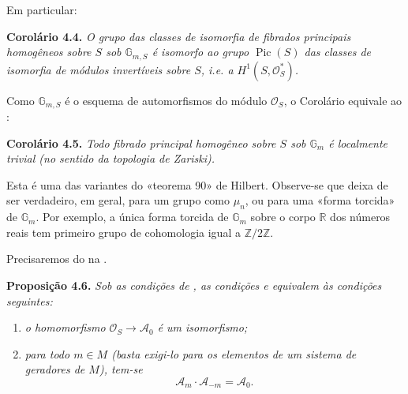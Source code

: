 Em particular:

\medskip
\noindent{}\textbf{Corolário 4.4.}
\textit{O grupo das classes de isomorfia de fibrados principais homogêneos
sobre \(S\) sob \(\mathbb G_{m,S}\) é isomorfo ao grupo
\(\operatorname{Pic}(S)\) das classes de isomorfia de módulos invertíveis
sobre \(S\), i.e. a \(H^1(S,\mathcal O_S^*)\).}

Como \(\mathbb G_{m,S}\) é o esquema de automorfismos do módulo
\(\mathcal O_S\), o Corolário
 equivale ao
:

\medskip
\noindent{}\textbf{Corolário 4.5.}
\textit{Todo fibrado principal homogêneo sobre \(S\) sob \(\mathbb G_m\)
é localmente trivial (no sentido da topologia de Zariski).}

Esta é uma das variantes do «teorema 90» de Hilbert.
Observe-se que  deixa de ser
verdadeiro, em geral, para um grupo como \(\mu_n\), ou para uma «forma
torcida» de \(\mathbb G_m\). Por exemplo, a única forma torcida de
\(\mathbb G_m\) sobre o corpo \(\mathbb R\) dos números reais tem
primeiro grupo de cohomologia igual a \(\mathbb Z/2\mathbb Z\).


Precisaremos do 
na .

\medskip
\noindent{}\textbf{Proposição 4.6.}
\textit{Sob as condições de
, as condições
 e
 equivalem às
condições seguintes:}
\begin{enumerate}
  \item[\((a')\)]
  \textit{o homomorfismo \(\mathcal O_S\to\mathscr A_0\) é um
  isomorfismo;}

  \item[\((b')\)]
  \textit{para todo \(m\in M\) (basta exigi-lo para os elementos de um
  sistema de geradores de \(M\)), tem-se}
  \[
    \mathscr A_m\mathbin{\cdot}\mathscr A_{-m}=\mathscr A_0.
  \]
\end{enumerate}

